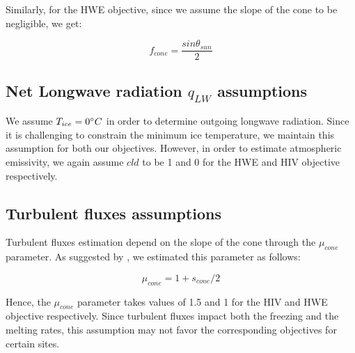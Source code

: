 \documentclass[tc, manuscript]{copernicus}
\begin{document}
Similarly, for the HWE objective, since we assume the slope of the cone to be negligible, we get:

\begin{equation}
		f_{cone} =\frac{ sin \theta_{sun} }{2 }
\end{equation}

\subsection{Net Longwave radiation \texorpdfstring{$q_{LW}$}{Lg} assumptions} 

We assume $T_{ice} = 0 ^{\circ} C$ in order to determine outgoing longwave radiation. Since it is challenging to
constrain the minimum ice temperature, we maintain this assumption for both our objectives. However, in order to
estimate atmospheric emissivity, we again assume $cld$ to be 1 and 0 for the HWE and HIV objective respectively.

\subsection{Turbulent fluxes assumptions} \label{sec:Qs}

Turbulent fluxes estimation depend on the slope of the cone through the $\mu_{cone}$ parameter. As suggested 
by \citet{oerlemansBriefCommunicationGrowth2021}, we estimated this parameter as follows:

\begin{equation}
  \mu_{cone} =1 + s_{cone}/2
\end{equation}

Hence, the $\mu_{cone}$ parameter takes values of 1.5 and 1 for the HIV and HWE objective respectively.  Since
turbulent fluxes impact both the freezing and the melting rates, this assumption may not favor the corresponding
objectives for certain sites.



\noappendix 



\end{document}
